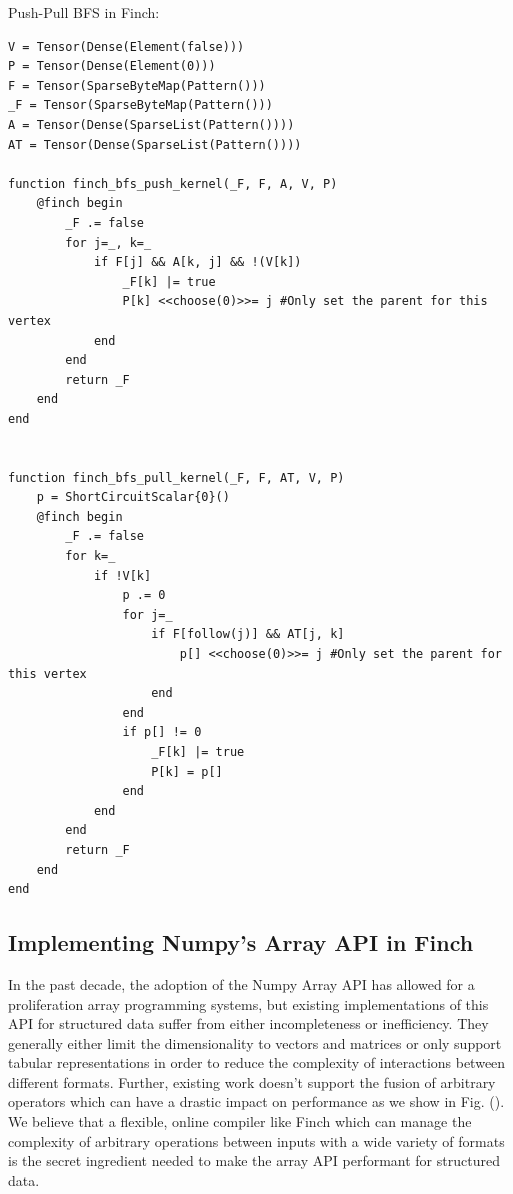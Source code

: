 Push-Pull BFS in Finch:
\begin{verbatim}
V = Tensor(Dense(Element(false)))
P = Tensor(Dense(Element(0)))
F = Tensor(SparseByteMap(Pattern()))
_F = Tensor(SparseByteMap(Pattern()))
A = Tensor(Dense(SparseList(Pattern())))
AT = Tensor(Dense(SparseList(Pattern())))

function finch_bfs_push_kernel(_F, F, A, V, P)
    @finch begin
        _F .= false
        for j=_, k=_
            if F[j] && A[k, j] && !(V[k])
                _F[k] |= true
                P[k] <<choose(0)>>= j #Only set the parent for this vertex
            end
        end
        return _F
    end
end


function finch_bfs_pull_kernel(_F, F, AT, V, P)
    p = ShortCircuitScalar{0}()
    @finch begin
        _F .= false
        for k=_
            if !V[k]
                p .= 0
                for j=_
                    if F[follow(j)] && AT[j, k]
                        p[] <<choose(0)>>= j #Only set the parent for this vertex
                    end
                end
                if p[] != 0
                    _F[k] |= true
                    P[k] = p[]
                end
            end
        end
        return _F
    end
end
\end{verbatim}

\subsection{Implementing Numpy's Array API in Finch}
In the past decade, the adoption of the Numpy Array API \cite{harris_array_2020} has allowed for a proliferation array programming systems, but existing implementations of this API for structured data suffer from either incompleteness or inefficiency. They generally either limit the dimensionality to vectors and matrices or only support tabular representations in order to reduce the complexity of interactions between different formats. Further, existing work doesn't support the fusion of arbitrary operators which can have a drastic impact on performance as we show in Fig. (). We believe that a flexible, online compiler like Finch which can manage the complexity of arbitrary operations between inputs with a wide variety of formats is the secret ingredient needed to make the array API performant for structured data.


